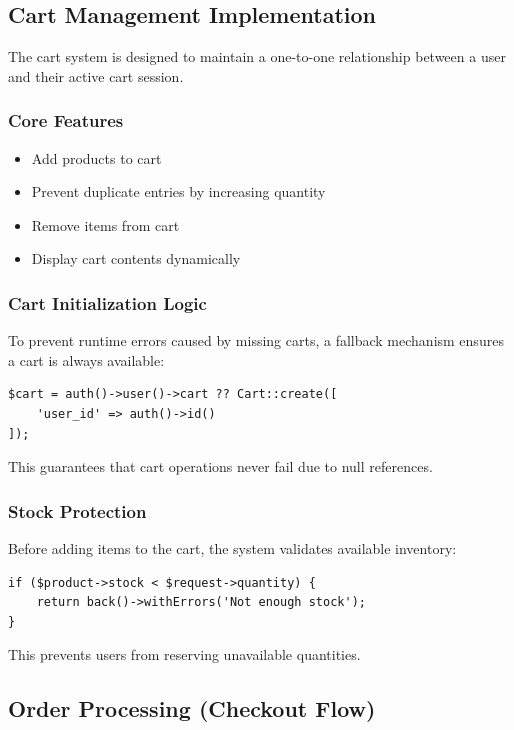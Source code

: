 \documentclass[12pt,a4paper]{article}
\begin{document}
\subsection{Cart Management Implementation}

The cart system is designed to maintain a one-to-one relationship between a user and their active cart session.

\subsubsection{Core Features}
\begin{itemize}[noitemsep]
    \item Add products to cart
    \item Prevent duplicate entries by increasing quantity
    \item Remove items from cart
    \item Display cart contents dynamically
\end{itemize}

\subsubsection{Cart Initialization Logic}
To prevent runtime errors caused by missing carts, a fallback mechanism ensures a cart is always available:

\begin{verbatim}
$cart = auth()->user()->cart ?? Cart::create([
    'user_id' => auth()->id()
]);
\end{verbatim}

This guarantees that cart operations never fail due to null references.

\subsubsection{Stock Protection}
Before adding items to the cart, the system validates available inventory:

\begin{verbatim}
if ($product->stock < $request->quantity) {
    return back()->withErrors('Not enough stock');
}
\end{verbatim}

This prevents users from reserving unavailable quantities.

\subsection{Order Processing (Checkout Flow)}
\end{document}
